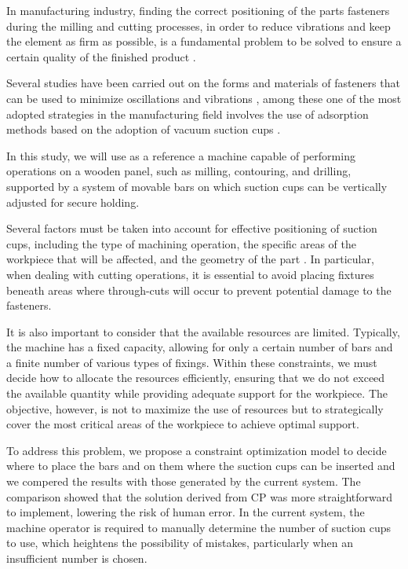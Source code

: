 \documentclass[runningheads]{llncs}
\begin{document}
In manufacturing industry, finding the correct positioning of the parts fasteners during the milling and cutting processes, in order to reduce vibrations and keep the element as firm as possible, is a fundamental problem to be solved to ensure a certain quality of the finished product \cite{fei2020state}.

Several studies have been carried out on the forms and materials of fasteners that can be used to minimize oscillations and vibrations \cite{sivasubramanian2019optimization,chung2001materials}, among these one of the most adopted strategies in the manufacturing field involves the use of adsorption methods based on the adoption of vacuum suction cups \cite{zhu2006principle,del2019thin}.

In this study, we will use as a reference a machine capable of performing operations on a wooden panel, such as milling, contouring, and drilling, supported by a system of movable bars on which suction cups can be vertically adjusted for secure holding. 

Several factors must be taken into account for effective positioning of suction cups, including the type of machining operation, the specific areas of the workpiece that will be affected, and the geometry of the part \cite{rachierumethodology}. In particular, when dealing with cutting operations, it is essential to avoid placing fixtures beneath areas where through-cuts will occur to prevent potential damage to the fasteners.

It is also important to consider that the available resources are limited. Typically, the machine has a fixed capacity, allowing for only a certain number of bars and a finite number of various types of fixings. Within these constraints, we must decide how to allocate the resources efficiently, ensuring that we do not exceed the available quantity while providing adequate support for the workpiece. The objective, however, is not to maximize the use of resources but to strategically cover the most critical areas of the workpiece to achieve optimal support.

To address this problem, we propose a constraint optimization model to decide where to place the bars and on them where the suction cups can be inserted and we compered the results with those generated by the current system. The comparison showed that the solution derived from CP was more straightforward to implement, lowering the risk of human error. In the current system, the machine operator is required to manually determine the number of suction cups to use, which heightens the possibility of mistakes, particularly when an insufficient number is chosen.
\end{document}
